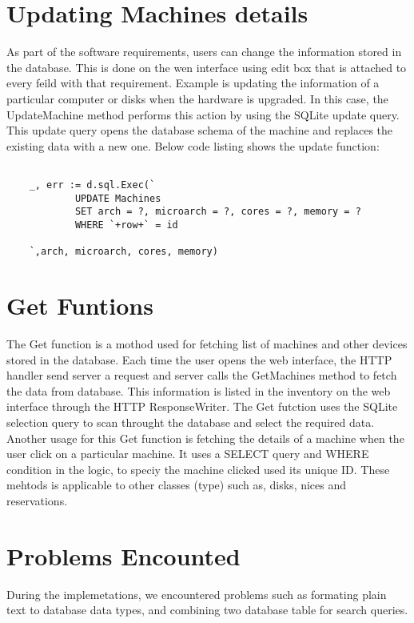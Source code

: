 \section*{Updating Machines details}
As part of the software requirements, users can change the information stored in the database. This is done on the wen interface using edit box that is attached to every feild with that requirement. Example is updating the information of a particular computer or disks when the hardware is upgraded. In this case, the UpdateMachine method performs this action by using the SQLite update query. This update query opens the database schema of the machine and replaces the existing data with a new one.
Below code listing shows the update function:
\begin{lstlisting}[caption=Function for Updating data, label=Update function]

	_, err := d.sql.Exec(`
			UPDATE Machines
			SET arch = ?, microarch = ?, cores = ?, memory = ?
			WHERE `+row+` = id

	`,arch, microarch, cores, memory)

\end{lstlisting}
\section{Get Funtions}
The Get function is a mothod used for fetching list of machines and other devices stored in the database. Each time the user opens the web interface, the HTTP handler send server a request and server calls the GetMachines method to fetch the data from database. This information is listed in the inventory on the web interface through the HTTP ResponseWriter. The Get futction uses the SQLite selection query to scan throught the database and select the required data.  Another usage for this Get function is fetching the details of a machine when the user click on a particular machine. It uses a SELECT query and WHERE condition in the logic, to speciy the machine clicked used its unique ID. These mehtods is applicable to other classes (type) such as, disks, nices and reservations. 
 
\section{Problems Encounted}
During the implemetations, we encountered problems such as formating plain text to database data types, and combining two database table for search queries.




